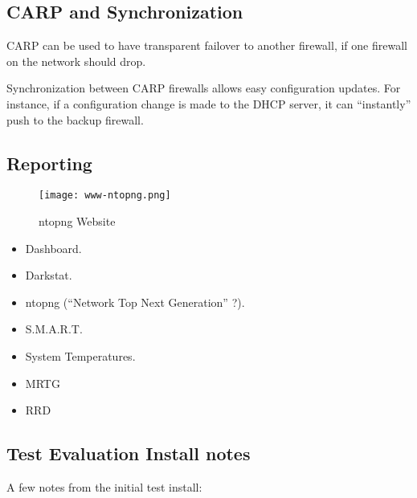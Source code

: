 \subsection{CARP and Synchronization}
CARP can be used to have transparent failover to another firewall, if one
firewall on the network should drop.

Synchronization between CARP firewalls allows easy configuration updates. For
instance, if a configuration change is made to the DHCP server, it can
``instantly'' push to the backup firewall.


\subsection{Reporting}

\begin{figure}[h!]
\texttt{[image: www-ntopng.png]}
 \caption{ntopng Website}
 \label{fig:www-ntopng}
\end{figure}

\begin{itemize}
 \item Dashboard.
 \item Darkstat.
 \item ntopng (``Network Top Next Generation'' ?).
 \item S.M.A.R.T.
 \item System Temperatures.
 \item MRTG
 \item RRD
\end{itemize}


\subsection{Test Evaluation Install notes}

A few notes from the initial test install:

